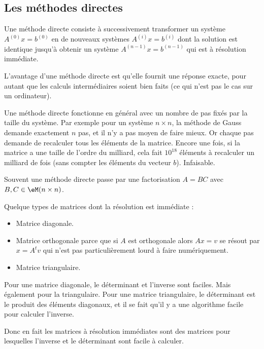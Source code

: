 \subsection{Les méthodes directes}

Une méthode directe consiste à successivement transformer un système \( A^{(0)}x=b^{(0)}\) en de nouveaux systèmes \( A^{(i)}x=b^{(i)}\) dont la solution est identique jusqu'à obtenir un système \( A^{(n-1)}x=b^{(n-1)}\) qui est à résolution immédiate.

L'avantage d'une méthode directe est qu'elle fournit une réponse exacte, pour autant que les calculs intermédiaires soient bien faits (ce qui n'est pas le cas sur un ordinateur).

Une méthode directe fonctionne en général avec un nombre de pas fixés par la taille du système. Par exemple pour un système \( n\times n\), la méthode de Gauss demande exactement \( n\) pas, et il n'y a pas moyen de faire mieux. Or chaque pas demande de recalculer tous les éléments de la matrice. Encore une fois, si la matrice a une taille de l'ordre du milliard, cela fait \( 10^{18}\) éléments à recalculer un milliard de fois (sans compter les éléments du vecteur \( b\)). Infaisable.


Souvent une méthode directe passe par une factorisation \( A=BC\) avec \( B,C\in \eM(n\times n)\).

Quelque types de matrices dont la résolution est immédiate :
\begin{itemize}
    \item Matrice diagonale.
    \item Matrice orthogonale parce que si \( A\) est orthogonale alors \( Ax=v\) se résout par \( x=A^tv\) qui n'est pas particulièrement lourd à faire numériquement.
    \item Matrice triangulaire.
\end{itemize}

\begin{remark}
    Pour une matrice diagonale, le déterminant et l'inverse sont faciles. Mais également pour la triangulaire. Pour une matrice triangulaire, le déterminant est le produit des éléments diagonaux, et il se fait qu'il y a une algorithme facile pour calculer l'inverse.

    Donc en fait les matrices à résolution immédiates sont des matrices pour lesquelles l'inverse et le déterminant sont facile à calculer.
\end{remark}

